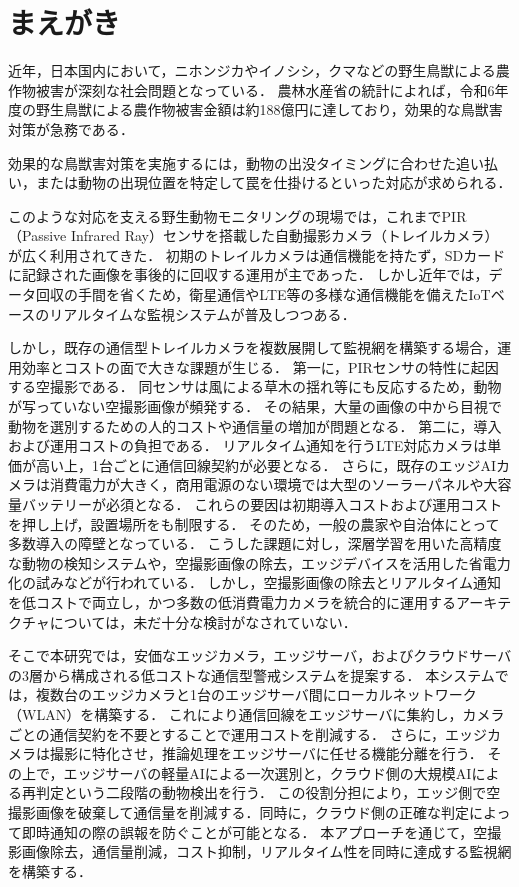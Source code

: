 \documentclass[technicalreport]{ieicej}
\begin{document}
\section{まえがき}
近年，日本国内において，ニホンジカやイノシシ，クマなどの野生鳥獣による農作物被害が深刻な社会問題となっている．
農林水産省の統計によれば，令和6年度の野生鳥獣による農作物被害金額は約188億円に達しており，効果的な鳥獣害対策が急務である\cite{maff}．

効果的な鳥獣害対策を実施するには，動物の出没タイミングに合わせた追い払い，または動物の出現位置を特定して罠を仕掛けるといった対応が求められる．

このような対応を支える野生動物モニタリングの現場では，これまでPIR（Passive Infrared Ray）センサを搭載した自動撮影カメラ（トレイルカメラ）が広く利用されてきた\cite{Tabak2019,Beery2019,rs18030502}．
初期のトレイルカメラは通信機能を持たず，SDカードに記録された画像を事後的に回収する運用が主であった．
しかし近年では，データ回収の手間を省くため，衛星通信やLTE等の多様な通信機能を備えたIoTベースのリアルタイムな監視システムが普及しつつある\cite{Whytock2023,Patkar2025,9345858}．

しかし，既存の通信型トレイルカメラを複数展開して監視網を構築する場合，運用効率とコストの面で大きな課題が生じる．
第一に，PIRセンサの特性に起因する空撮影である．
同センサは風による草木の揺れ等にも反応するため，動物が写っていない空撮影画像が頻発する\cite{Beery2019}．
その結果，大量の画像の中から目視で動物を選別するための人的コストや通信量の増加が問題となる．
第二に，導入および運用コストの負担である．
リアルタイム通知を行うLTE対応カメラは単価が高い上，1台ごとに通信回線契約が必要となる．
さらに，既存のエッジAIカメラは消費電力が大きく，商用電源のない環境では大型のソーラーパネルや大容量バッテリーが必須となる\cite{Sato2022}．
これらの要因は初期導入コストおよび運用コストを押し上げ，設置場所をも制限する．
そのため，一般の農家や自治体にとって多数導入の障壁となっている．
こうした課題に対し，深層学習を用いた高精度な動物の検知システム\cite{10394750,10126065}や，空撮影画像の除去\cite{Tabak2019,Beery2019,VELASCOMONTERO2024102815}，エッジデバイスを活用した省電力化の試み\cite{IEICE2020,Sato2022,VELASCOMONTERO2024102815}などが行われている．
しかし，空撮影画像の除去とリアルタイム通知を低コストで両立し，かつ多数の低消費電力カメラを統合的に運用するアーキテクチャについては，未だ十分な検討がなされていない．

そこで本研究では，安価なエッジカメラ，エッジサーバ，およびクラウドサーバの3層から構成される低コストな通信型警戒システムを提案する．
本システムでは，複数台のエッジカメラと1台のエッジサーバ間にローカルネットワーク（WLAN）を構築する．
これにより通信回線をエッジサーバに集約し，カメラごとの通信契約を不要とすることで運用コストを削減する．
さらに，エッジカメラは撮影に特化させ，推論処理をエッジサーバに任せる機能分離を行う．
その上で，エッジサーバの軽量AIによる一次選別と，クラウド側の大規模AIによる再判定という二段階の動物検出を行う．
この役割分担により，エッジ側で空撮影画像を破棄して通信量を削減する．同時に，クラウド側の正確な判定によって即時通知の際の誤報を防ぐことが可能となる．
本アプローチを通じて，空撮影画像除去，通信量削減，コスト抑制，リアルタイム性を同時に達成する監視網を構築する．
\end{document}
